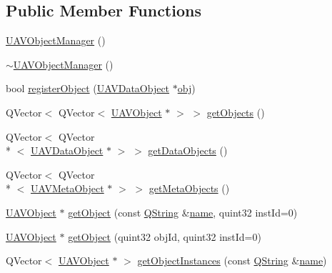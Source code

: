 \subsection*{Public Member Functions}
\begin{DoxyCompactItemize}
\item 
\hyperlink{group___u_a_v_objects_plugin_ga407e523ca4304b00cc600c49f110e60a}{U\-A\-V\-Object\-Manager} ()
\item 
\hyperlink{group___u_a_v_objects_plugin_ga0b1af95f366fc372f94307f59513933d}{$\sim$\-U\-A\-V\-Object\-Manager} ()
\item 
bool \hyperlink{group___u_a_v_objects_plugin_gad71bd0967de227335d5fec0b599a54e3}{register\-Object} (\hyperlink{class_u_a_v_data_object}{U\-A\-V\-Data\-Object} $\ast$\hyperlink{glext_8h_a0c0d4701a6c89f4f7f0640715d27ab26}{obj})
\item 
Q\-Vector$<$ Q\-Vector$<$ \hyperlink{class_u_a_v_object}{U\-A\-V\-Object} $\ast$ $>$ $>$ \hyperlink{group___u_a_v_objects_plugin_ga90cc8567b44fd696df9fffa8a3f24f0c}{get\-Objects} ()
\item 
Q\-Vector$<$ Q\-Vector\\*
$<$ \hyperlink{class_u_a_v_data_object}{U\-A\-V\-Data\-Object} $\ast$ $>$ $>$ \hyperlink{group___u_a_v_objects_plugin_gaddd03a2027eb1ac4f3208d3fda7e76c9}{get\-Data\-Objects} ()
\item 
Q\-Vector$<$ Q\-Vector\\*
$<$ \hyperlink{class_u_a_v_meta_object}{U\-A\-V\-Meta\-Object} $\ast$ $>$ $>$ \hyperlink{group___u_a_v_objects_plugin_ga8c25b065c3e4f456b2e3a7913f6d764f}{get\-Meta\-Objects} ()
\item 
\hyperlink{class_u_a_v_object}{U\-A\-V\-Object} $\ast$ \hyperlink{group___u_a_v_objects_plugin_gada44cdbfa55a281b78d41abcc6834dc0}{get\-Object} (const \hyperlink{group___u_a_v_objects_plugin_gab9d252f49c333c94a72f97ce3105a32d}{Q\-String} \&\hyperlink{glext_8h_ad977737dfc9a274a62741b9500c49a32}{name}, quint32 inst\-Id=0)
\item 
\hyperlink{class_u_a_v_object}{U\-A\-V\-Object} $\ast$ \hyperlink{group___u_a_v_objects_plugin_ga6d299736b20c625d2553f80123e71e7a}{get\-Object} (quint32 obj\-Id, quint32 inst\-Id=0)
\item 
Q\-Vector$<$ \hyperlink{class_u_a_v_object}{U\-A\-V\-Object} $\ast$ $>$ \hyperlink{group___u_a_v_objects_plugin_ga575678dce0852cc3843610477ea587ff}{get\-Object\-Instances} (const \hyperlink{group___u_a_v_objects_plugin_gab9d252f49c333c94a72f97ce3105a32d}{Q\-String} \&\hyperlink{glext_8h_ad977737dfc9a274a62741b9500c49a32}{name})

\end{DoxyCompactItemize}
